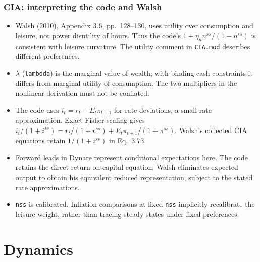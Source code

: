 \documentclass[handout]{beamer}
\begin{document}
\begin{frame}
\frametitle{CIA: interpreting the code and Walsh}
\footnotesize
\begin{itemize}
\item Walsh (2010), Appendix 3.6, pp.~128--130, uses utility over
consumption and leisure, not power disutility of hours. Thus the code's
$1+\eta_n n^{ss}/(1-n^{ss})$ is consistent with leisure curvature.
The utility comment in \texttt{CIA.mod} describes different preferences.
\item $\lambda$ (\texttt{lambdda}) is the marginal value of wealth;
with binding cash constraints it differs from marginal utility of consumption.
The two multipliers in the nonlinear derivation must not be conflated.
\item The code uses $i_t=r_t+E_t\pi_{t+1}$ for rate deviations,
a small-rate approximation. Exact Fisher scaling gives
$i_t/(1+i^{ss})=r_t/(1+r^{ss})+E_t\pi_{t+1}/(1+\pi^{ss})$.
Walsh's collected CIA equations retain $1/(1+i^{ss})$ in Eq.~3.73.
\item Forward leads in Dynare represent conditional expectations here.
The code retains the direct return-on-capital equation; Walsh eliminates
expected output to obtain his equivalent reduced representation,
subject to the stated rate approximations.
\item \texttt{nss} is calibrated. Inflation comparisons at fixed
\texttt{nss} implicitly recalibrate the leisure weight, rather than tracing
steady states under fixed preferences.
\end{itemize}
\end{frame}

\section{Dynamics}
\end{document}
